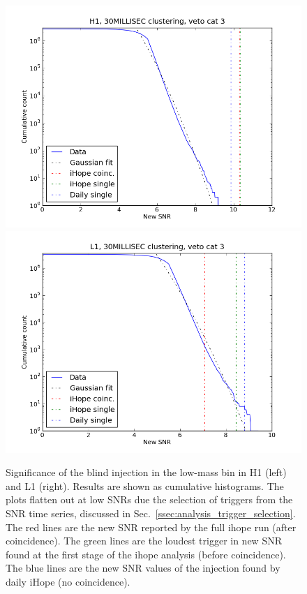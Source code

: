 \begin{figure}
  \includegraphics[width=0.5\linewidth]{figures/detchar/LM_H1_30MILLISEC_3_hist.png}
  \includegraphics[width=0.5\linewidth]{figures/detchar/LM_L1_30MILLISEC_3_hist.png}
  \caption[Significance of the injection in the low-mass bin]{
  \label{f:daily_histogram_low}
Significance of the blind injection in the low-mass bin in H1 (left)
and L1 (right). Results are shown as cumulative histograms.  The plots
flatten out at low SNRs due the selection of triggers from the SNR
time series, discussed in
Sec.~\ref{ssec:analysis_trigger_selection}.  The red lines are the
new SNR reported by the full ihope run (after coincidence).  The green
lines are the loudest trigger in new SNR found at the first stage of
the ihope analysis (before coincidence).  The blue lines are the new
SNR values of the injection found by daily iHope (no coincidence).}
\end{figure}%



